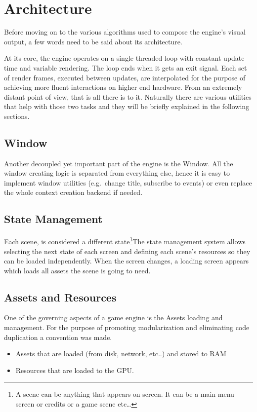 \section{Architecture}
Before moving on to the various algorithms used to compose the engine's visual output, a few
words need to be said about its architecture.

At its core, the engine operates on a single threaded loop with constant update time and
variable rendering. The loop ends when it gets an exit signal. Each set of render frames,
executed between updates, are interpolated for the purpose of achieving more fluent interactions
on higher end hardware. From an extremely distant point of view, that is all there is to it.
Naturally there are various utilities that help with those two tasks and they will be briefly
explained in the following sections.

\subsection{Window}
Another decoupled yet important part of the engine is the Window. All the window creating logic
is separated from everything else, hence it is easy to implement window utilities (e.g.\ change
title, subscribe to events) or even replace the whole context creation backend if needed.

\subsection{State Management}
Each scene, is considered a different state\footnote{A scene can be anything that appears on
screen. It can be a main menu screen or credits or a game scene etc\dots}The state management
system allows selecting the next state of each screen and defining each scene's resources
so they can be loaded independently. When the screen changes, a loading screen appears which loads
all assets the scene is going to need.

\subsection{Assets and Resources}
One of the governing aspects of a game engine is the Assets loading and management. For the
purpose of promoting modularization and eliminating code duplication a convention was made.

\begin{itemize}
\item Assets that are loaded (from disk, network, etc..) and stored to RAM
\item Resources that are loaded to the GPU\@.
\end{itemize}

